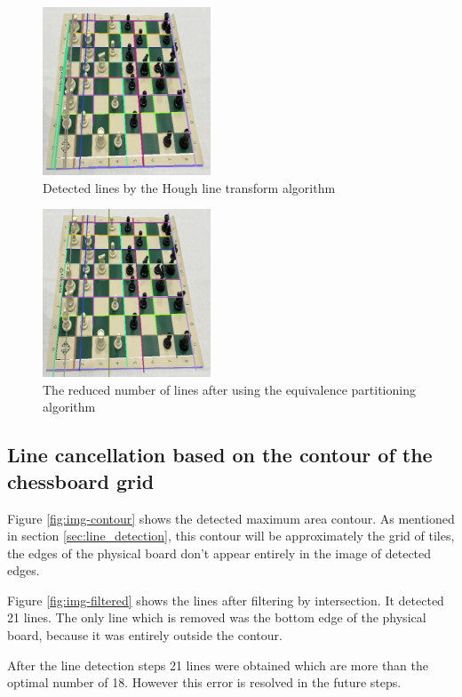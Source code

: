 \documentclass[conference]{IEEEtran}
\begin{document}
\begin{figure}[bt] 
    \centering
    \includegraphics[width=5cm]{Figures/Detected Lines.png}
    \caption{Detected lines by the Hough  line  transform  algorithm}
    \label{fig:img-hough}
\end{figure}

\begin{figure}[bt] 
    \centering
    \includegraphics[width=5cm]{Figures/Reduced Lines.png}
    \caption{The reduced number of lines after using the equivalence partitioning algorithm}
    \label{fig:img-reduced}
\end{figure}


\subsection{Line cancellation based on the contour of the chessboard grid}

Figure \ref{fig:img-contour} shows the detected maximum area contour. As mentioned in section \ref{sec:line_detection}, this contour will be approximately the grid of tiles, the edges of the physical board don't appear entirely in the image of detected edges.

Figure \ref{fig:img-filtered} shows the lines after filtering by intersection. It detected 21 lines. The only line which is removed was the bottom edge of the physical board, because it was entirely outside the contour.

After the line detection steps 21 lines were obtained which are more than the optimal number of 18. However this error is resolved in the future steps.
\end{document}
